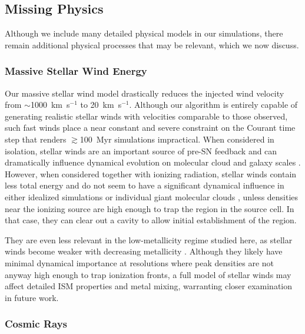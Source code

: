 \documentclass[twocolumn]{aastex61}
\begin{document}
\subsection{Missing Physics}
Although we include many detailed physical models in our simulations, there remain additional physical processes that may be relevant, which we now discuss.

\subsubsection{Massive Stellar Wind Energy}
\label{sec:stellar winds discussion}
Our massive stellar wind model drastically reduces the injected wind velocity from $\sim$1000~km~s$^{-1}$ to 20~km~s$^{-1}$. Although our algorithm is entirely capable of generating realistic stellar winds with velocities comparable to those observed, such fast winds place a near constant and severe constraint on the Courant time step that renders $\gtrsim$100~Myr simulations impractical. When considered in isolation, stellar winds are an important source of pre-SN feedback and can dramatically influence dynamical evolution on molecular cloud and galaxy scales \citep{Dale2008,Peters2017,Gatto2017}. However, when considered together with ionizing radiation, stellar winds contain less total energy \citep{Agertz2013} and do not seem to have a significant dynamical influence in either idealized simulations \citep{Geen2015} or  individual giant molecular clouds \citep{Dale2014}, unless densities near the ionizing source are high enough to trap the   region in the source cell. In that case, they can clear out a cavity to allow initial establishment of the  region. 

They are even less relevant in the low-metallicity regime studied here, as stellar winds become weaker with decreasing metallicity \citep{Puls2000, Vink2005}. Although they likely have minimal dynamical importance at resolutions where peak densities are not anyway high enough to trap ionization fronts, a full model of stellar winds may affect detailed ISM properties and metal mixing, warranting closer examination in future work.


\subsubsection{Cosmic Rays} 
\end{document}
